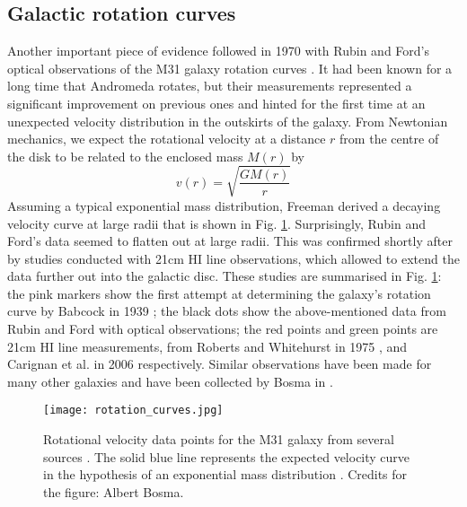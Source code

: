 \subsection{Galactic rotation curves}
Another important piece of evidence followed in 1970 with Rubin and Ford's optical observations of the M31 galaxy rotation curves \cite{Rubin_1970}. It had been known for a long time that Andromeda rotates, but their measurements represented a significant improvement on previous ones and hinted for the first time at an unexpected velocity distribution in the outskirts of the galaxy. From Newtonian mechanics, we expect the rotational velocity at a distance \(r\) from the centre of the disk to be related to the enclosed mass \(M(r)\) by \cite{Lisanti_2018}
\begin{equation}\label{eq:rotational_velocity}
	v(r)=\sqrt{\frac{GM(r)}{r}} 
\end{equation}
Assuming a typical exponential mass distribution, Freeman \cite{Freeman_1970} derived a decaying velocity curve at large radii that is shown in Fig. \ref{fig:rotation_curves}. Surprisingly, Rubin and Ford's data seemed to flatten out at large radii. This was confirmed shortly after by studies conducted with 21cm HI line observations, which allowed to extend the data further out into the galactic disc. These studies are summarised in Fig. \ref{fig:rotation_curves}: the pink markers show the first attempt at determining the galaxy's rotation curve by Babcock in 1939 \cite{Babcock_1939}; the black dots show the above-mentioned data from Rubin and Ford with optical observations; the red points and green points are 21cm HI line measurements, from Roberts and Whitehurst in 1975 \cite{Roberts_1975}, and Carignan et al. in 2006 \cite{Carignan_2006} respectively. Similar observations have been made for many other galaxies and have been collected by Bosma in \cite{Bosma_1981}.
\begin{figure}[!ht]
	\centering
	\texttt{[image: rotation\_curves.jpg]}
	\caption{Rotational velocity data points for the M31 galaxy from several sources \cite{Babcock_1939, Rubin_1970, Roberts_1975, Carignan_2006}. The solid blue line represents the expected velocity curve in the hypothesis of an exponential mass distribution \cite{Freeman_1970}. Credits for the figure: Albert Bosma.}
	\label{fig:rotation_curves}
\end{figure}

